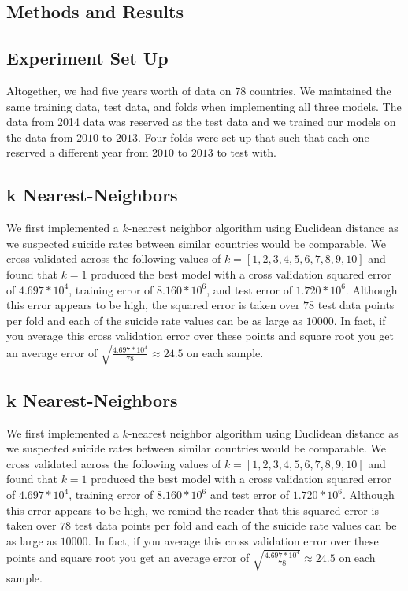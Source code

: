 \documentclass{article}
\begin{document}
\begin{multicols}{2}
\section{Methods and Results}
\subsection{Experiment Set Up} Altogether, we had five years worth of data on $78$ countries. We maintained the same training data, test data, and folds when implementing all three models. The data from 2014 data was reserved as the test data and we trained our models on the data from $2010$ to $2013$. Four folds were set up that such that each one reserved a different year from $2010$ to $2013$ to test with. 

\subsection{k Nearest-Neighbors} We first implemented a $k$-nearest neighbor algorithm using Euclidean distance as we suspected suicide rates between similar countries would be comparable. We cross validated across the following values of $k = [1,2, 3, 4, 5, 6, 7, 8, 9, 10]$ and found that $k = 1$ produced the best model with a cross validation squared error of $4.697 * 10^4$, training error of $8.160 * 10^6$, and test error of $1.720 * 10^6$. Although this error appears to be high, the squared error is taken over $78$ test data points per fold and each of the suicide rate values can be as large as $10000$. In fact, if you average this cross validation error over these points and square root you get an average error of $\sqrt{\frac{4.697 * 10^4}{78}} \approx 24.5 $ on each sample. 

\subsection{k Nearest-Neighbors} We first implemented a $k$-nearest neighbor algorithm using Euclidean distance as we suspected suicide rates between similar countries would be comparable. We cross validated across the following values of $k = [1,2, 3, 4, 5, 6, 7, 8, 9, 10]$ and found that $k = 1$ produced the best model with a cross validation squared error of $4.697 * 10^4$, training error of $8.160 * 10^6$ and test error of $1.720 * 10^6$. Although this error appears to be high, we remind the reader that this squared error is taken over $78$ test data points per fold and each of the suicide rate values can be as large as $10000$. In fact, if you average this cross validation error over these points and square root you get an average error of $\sqrt{\frac{4.697 * 10^4}{78}} \approx 24.5 $ on each sample. 


\end{multicols}
\end{document}
